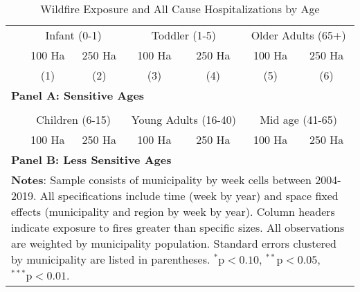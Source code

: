 \documentclass[11pt]{article}
\begin{document}
\begin{spacing}{1.3}
\begin{table}[htpb!]
    \caption{Wildfire Exposure and All Cause Hospitalizations by Age}
    \label{tab:RFhospAge}
    \centering
    \begin{tabular}{lcccccc} \\ \toprule
    & \multicolumn{2}{c}{Infant (0-1)}  & \multicolumn{2}{c}{Toddler (1-5)} & \multicolumn{2}{c}{Older Adults (65+)}
    \\ \cmidrule(r){2-3}\cmidrule(r){4-5}\cmidrule(r){6-7}
    & 100 Ha & 250 Ha & 100 Ha & 250 Ha & 100 Ha & 250 Ha\\ 
    & (1) & (2) & (3) & (4) & (5) & (6) \\ \midrule
    \multicolumn{7}{l}{\textbf{Panel A: Sensitive Ages}}\\
     
    \midrule \\
    & \multicolumn{2}{c}{Children (6-15)}  & \multicolumn{2}{c}{Young Adults (16-40)} & \multicolumn{2}{c}{Mid age (41-65)} \\ 
    \cmidrule(r){2-3}\cmidrule(r){4-5}\cmidrule(r){6-7}
    & 100 Ha & 250 Ha & 100 Ha & 250 Ha & 100 Ha & 250 Ha\\ 
    \midrule
    \multicolumn{7}{l}{\textbf{Panel B: Less Sensitive Ages}}\\
     
    \bottomrule
    \multicolumn{7}{p{14.6cm}}{{\footnotesize \textbf{Notes}: Sample consists of municipality by week cells between 2004-2019.  All specifications include time (week by year) and space fixed effects (municipality and region by week by year).  Column headers indicate exposure to fires greater than specific sizes.  All observations are weighted by municipality population.  Standard errors clustered by municipality are listed in parentheses.   $^{*}\text{p}<0.10$, $^{**}\text{p}<0.05$, $^{***}\text{p}<0.01$.}}
    \end{tabular}
\end{table}

\clearpage


\end{spacing}
\end{document}
